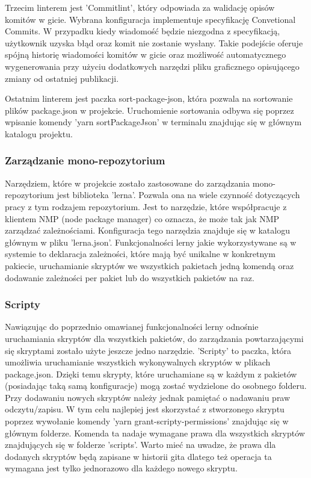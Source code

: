Trzecim linterem jest 'Commitlint', który odpowiada za walidację opisów komitów w gicie. Wybrana konfiguracja implementuje specyfikację Convetional Commits. W przypadku kiedy wiadomość będzie niezgodna z specyfikacją, użytkownik uzyska błąd oraz komit nie zostanie wysłany. Takie podejście oferuje spójną historię wiadomości komitów w gicie oraz możliwość automatycznego wygenerowania przy użyciu dodatkowych narzędzi pliku graficznego opisującego zmiany od ostatniej publikacji.

Ostatnim linterem jest paczka sort-package-json, która pozwala na sortowanie plików package.json w projekcie. Uruchomienie sortowania odbywa się poprzez wpisanie komendy 'yarn sortPackageJson' w terminalu znajdując się w głównym katalogu projektu. 

\subsubsection{Zarządzanie mono-repozytorium}
Narzędziem, które w projekcie zostało zastosowane do zarządzania mono-repozytorium jest biblioteka 'lerna'. Pozwala ona na wiele czynność dotyczących pracy z tym rodzajem repozytorium. Jest to narzędzie, które współpracuje z klientem NMP (node package manager) co oznacza, że może tak jak NMP zarządzać zależnościami. Konfiguracja tego narzędzia znajduje się w katalogu głównym w pliku 'lerna.json'. Funkcjonalności lerny jakie wykorzystywane są w systemie to deklaracja zależności, które mają być unikalne w konkretnym pakiecie, uruchamianie skryptów we wszystkich pakietach jedną komendą oraz dodawanie zależności per pakiet lub do wszystkich pakietów na raz.

\subsubsection{Scripty}
Nawiązując do poprzednio omawianej funkcjonalności lerny odnośnie uruchamiania skryptów dla wszystkich pakietów, do zarządzania powtarzającymi się skryptami zostało użyte jeszcze jedno narzędzie. 'Scripty' to paczka, która umożliwia uruchamianie wszystkich wykonywalnych skryptów w plikach package.json. Dzięki temu skrypty, które uruchamiane są w każdym z pakietów (posiadając taką samą konfiguracje) mogą zostać wydzielone do osobnego folderu. Przy dodawaniu nowych skryptów należy jednak pamiętać o nadawaniu praw odczytu/zapisu. W tym celu najlepiej jest skorzystać z stworzonego skryptu poprzez wywołanie komendy 'yarn grant-scripty-permissions' znajdując się w głównym folderze. Komenda ta nadaje wymagane prawa dla wszystkich skryptów znajdujących się w folderze 'scripts'. Warto mieć na uwadze, że prawa dla dodanych skryptów będą zapisane w historii gita dlatego też operacja ta wymagana jest tylko jednorazowo dla każdego nowego skryptu.

